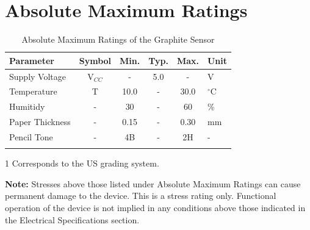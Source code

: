 \documentclass[10pt]{datasheet}
\begin{document}
\section{Absolute Maximum Ratings}

\begin{table}[h!]
\begin{threeparttable}
\caption{Absolute Maximum Ratings of the Graphite Sensor}
\begin{tabularx}{\textwidth}{l | c | c c c | X}
    \thickhline
    \textbf{Parameter} & \textbf{Symbol} & \textbf{Min.} & \textbf{Typ.} & \textbf{Max.} & \textbf{Unit} \\
    \hline
    Supply Voltage & V$_{CC}$ & - & 5.0 & - & V \\
    \hline
    Temperature & T & 10.0 & - & 30.0 & $^\circ$C \\
    Humitidy & - & 30 & - & 60 & \% \\
    \hline
    Paper Thickness & - & 0.15 & - & 0.30 & mm \\
    Pencil Tone\tnote{1} & - & 4B & - & 2H & - \\
    \thickhline
\end{tabularx}
\begin{tablenotes}
\item[1]{Corresponds to the US grading system.}
\end{tablenotes}
\end{threeparttable}
\end{table}

\textbf{Note:} Stresses above those listed under Absolute Maximum Ratings can
cause permanent damage to the device. This is a stress rating only. Functional
operation of the device is not implied in any conditions above those indicated
in the Electrical Specifications section.
\end{document}
